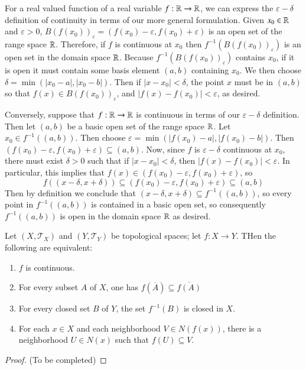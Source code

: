 \documentclass[12pt, a4paper, oneside, openright, titlepage]{book}
\begin{document}
\begin{eg}
    For a real valued function of a real variable $f:\mathbb R\rightarrow \mathbb R$, we can express the $\varepsilon-\delta$ definition of continuity in terms of our more general formulation. Given $x_0 \in \mathbb R$ and $\varepsilon > 0$, $B(f(x_0))_{\varepsilon} = (f(x_0) - \varepsilon, f(x_0) + \varepsilon)$ is an open set of the range space $\mathbb R$. Therefore, if $f$ is continuous at $x_0$ then $f^{-1}(B(f(x_0))_{\varepsilon})$ is an open set in the domain space $\mathbb R$. Because $f^{-1}(B(f(x_0))_{\varepsilon})$ contains $x_0$, if it is open it must contain some basis element $(a,b)$ containing $x_0$. We then choose $\delta = \min(|x_0 - a|, |x_0 - b|)$. Then if $|x-x_0| < \delta$, the point $x$ must be in $(a,b)$ so that $f(x) \in B(f(x_0))_{\varepsilon}$, and $|f(x)-f(x_0)| < \varepsilon$, as desired.


    Conversely, suppose that $f:\mathbb R\rightarrow \mathbb R$ is continuous in terms of our $\varepsilon-\delta$ definition. Then let $(a,b)$ be a basic open set of the range space $\mathbb R$. Let $x_0 \in f^{-1}((a,b))$. Then choose $\varepsilon = \min(|f(x_0) - a|, |f(x_0) - b|)$. Then $(f(x_0) - \varepsilon, f(x_0) +\varepsilon) \subseteq (a,b)$. Now, since $f$ is $\varepsilon-\delta$ continuous at $x_0$, there must exist $\delta > 0$ such that if $|x - x_0| < \delta$, then $|f(x) - f(x_0)| < \varepsilon$. In particular, this implies that $f(x) \in (f(x_0)-\varepsilon,f(x_0)+\varepsilon)$, so $$f((x-\delta,x+\delta)) \subseteq (f(x_0)-\varepsilon,f(x_0)+\varepsilon) \subseteq (a,b)$$ Then by definition we conclude that $(x-\delta,x+\delta) \subseteq f^{-1}((a,b))$, so every point in $f^{-1}((a,b))$ is contained in a basic open set, so consequently $f^{-1}((a,b))$ is open in the domain space $\mathbb R$ as desired.
\end{eg}



\begin{thm}
    Let $(X,\mathcal{T}_X)$ and $(Y,\mathcal{T}_Y)$ be topological spaces; let $f:X\rightarrow Y$. THen the following are equivalent: \begin{enumerate}
        \item $f$ is continuous.
        \item For every subset $A$ of $X$, one has $f(\overline{A}) \subseteq \overline{f(A)}$
        \item For every closed set $B$ of $Y$, the set $f^{-1}(B)$ is closed in $X$.
        \item For each $x \in X$ and each neighborhood $V \in N(f(x))$, there is a neighborhood $U \in N(x)$ such that $f(U) \subseteq V$.
    \end{enumerate}
\end{thm}
\begin{proof}
    (To be completed)
\end{proof}
\end{document}
